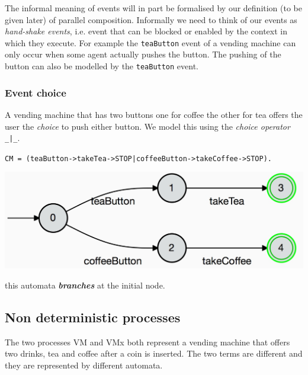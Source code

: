 \documentclass[]{article}
\begin{document}
 The informal meaning of events  will  in part be formalised  by our  definition (to be given later) of  parallel composition. Informally we need to think of our events as \emph{hand-shake events}, i.e. event that can be blocked or enabled by the context in which they execute. For example the \verb$teaButton$ event of a vending machine can only occur when some agent actually pushes the button.  The pushing of the button  can also be modelled  by the \verb$teaButton$ event.



 
\subsubsection{Event choice}
A vending machine that has two buttons one for coffee the other for tea offers the user the \emph{choice} to push either button. We model this using the \emph{choice operator} \verb$_|_$.

 
  
\noindent\begin{center}  \verb$CM = (teaButton->takeTea->STOP|coffeeButton->takeCoffee->STOP).$ 

\includegraphics[scale=0.15]{CM.jpg}\end{center}

\noindent this automata {\bf \it branches} at the  initial node.

\subsection{Non deterministic processes} \label{sec:ndfa}
The two processes {\sf VM}  and {\sf VMx} both represent a vending machine that offers two drinks, {\sf tea} and {\sf coffee} after a coin is inserted. The two  terms are different and they are represented by  different automata. 
\end{document}
